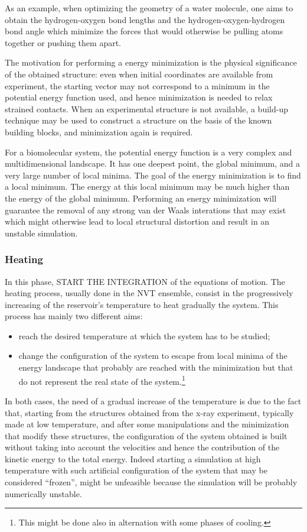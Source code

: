 As an example, when optimizing the geometry of a water molecule, one aims to obtain the hydrogen-oxygen bond lengths and the hydrogen-oxygen-hydrogen bond angle which minimize the forces that would otherwise be pulling atoms together or pushing them apart.

The motivation for performing a energy minimization is the physical significance of the obtained structure: even when initial coordinates are available from experiment, the starting vector may not correspond to a minimum in the potential energy function used, and hence minimization is needed to relax strained contacts. When an experimental structure is not available, a build-up technique may be used to construct a structure on the basis of the known building blocks, and minimization again is required.

For a biomolecular system, the potential energy function is a very complex and multidimensional landscape. It has one deepest point, the global minimum, and a very large number of local minima. The goal of the energy minimization is to find a local minimum. The energy at this local minimum may be much higher than the energy of the global minimum. Performing an energy minimization will guarantee the removal of any strong van der Waals interations that may exist which might otherwise lead to local structural distortion and result in an unstable simulation.


\subsubsection{Heating}
In this phase, START THE INTEGRATION of the equations of motion.
The heating process, usually done in the NVT ensemble, consist in the progressively increasing of  the reservoir's temperature to heat gradually the system. This process has mainly two different aims: 
\begin{itemize}
\item reach the desired temperature at which the system has to be studied;
\item change the configuration of the system to escape from local minima of the energy landscape that probably are reached with the minimization but that do not represent the real state of the system.\footnote{This might be done also in alternation with some phases of cooling.}
\end{itemize}
In both cases, the need of a gradual increase of the temperature is due to the fact that, starting from the structures obtained from the x-ray experiment, typically made at low temperature, and after some manipulations and the minimization that modify these structures, the configuration of the system obtained is built without taking into account the velocities and hence the contribution of the kinetic energy to the total energy. Indeed starting a simulation at high temperature with such artificial configuration of the system that may be considered ``frozen'', might be unfeasible because the simulation will be probably numerically unstable.

